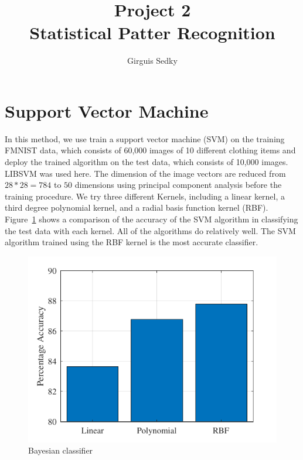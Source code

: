 \documentclass[12pt]{article}
\date{}
\title{Project 2 \large \\
        Statistical Patter Recognition}
\author{Girguis Sedky}
\begin{document}
\maketitle

\section{Support Vector Machine}
In this method, we use train a support vector machine (SVM) on the training FMNIST data, which consists of 60,000 images of 10 different clothing items and deploy the trained algorithm on the test data, which consists of 10,000 images. LIBSVM was used here. The dimension of the image vectors are reduced from $28*28=784$ to $50$ dimensions using principal component analysis before the training procedure. We try three different Kernels, including a linear kernel, a third degree polynomial kernel, and a radial basis function kernel (RBF). Figure~\ref{fig:SVM} shows a comparison of the accuracy of the SVM algorithm in classifying the test data with each kernel. All of the algorithms do relatively well. The SVM algorithm trained using the RBF kernel is the most accurate classifier. 


\begin{figure}[h]
 \centering
  \includegraphics[width=0.7\linewidth]{SVM_Accuracy.pdf}
  \caption{Bayesian classifier}
  \label{fig:SVM}
\end{figure}

\end{document}
